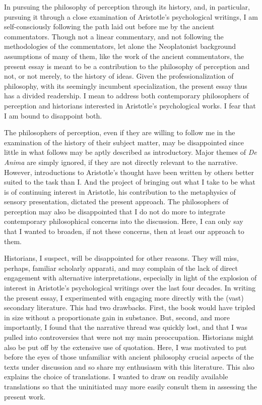 In pursuing the philosophy of perception through its history, and, in particular, pursuing it through a close examination of Aristotle's psychological writings, I am self-consciously following the path laid out before me by the ancient commentators. Though not a linear commentary, and not following the methodologies of the commentators, let alone the Neoplatonist background assumptions of many of them, like the work of the ancient commentators, the present essay is meant to be a contribution to the philosophy of perception and not, or not merely, to the history of ideas. Given the professionalization of philosophy, with its seemingly incumbent specialization, the present essay thus has a divided readership. I mean to address both contemporary philosophers of perception and historians interested in Aristotle's psychological works. I fear that I am bound to disappoint both. 

The philosophers of perception, even if they are willing to follow me in the examination of the history of their subject matter, may be disappointed since little in what follows may be aptly described as introductory. Major themes of \emph{De Anima} are simply ignored, if they are not directly relevant to the narrative. However, introductions to Aristotle's thought have been written by others better suited to the task than I. And the project of bringing out what I take to be what is of continuing interest in Aristotle, his contribution to the metaphysics of sensory presentation, dictated the present approach. The philosophers of perception may also be disappointed that I do not do more to integrate contemporary philosophical concerns into the discussion. Here, I can only say that I wanted to broaden, if not these concerns, then at least our approach to them.

Historians, I suspect, will be disappointed for other reasons. They will miss, perhaps, familiar scholarly apparati, and may complain of the lack of direct engagement with alternative interpretations, especially in light of the explosion of interest in Aristotle's psychological writings over the last four decades. In writing the present essay, I experimented with engaging more directly with the (vast) secondary literature. This had two drawbacks. First, the book would have tripled in size without a proportionate gain in substance. But, second, and more importantly, I found that the narrative thread was quickly lost, and that I was pulled into controversies that were not my main preoccupation. Historians might also be put off by the extensive use of quotation. Here, I was motivated to put before the eyes of those unfamiliar with ancient philosophy crucial aspects of the texts under discussion and so share my enthusiasm with this literature. This also explains the choice of translations. I wanted to draw on readily available translations so that the uninitiated may more easily consult them in assessing the present work.

